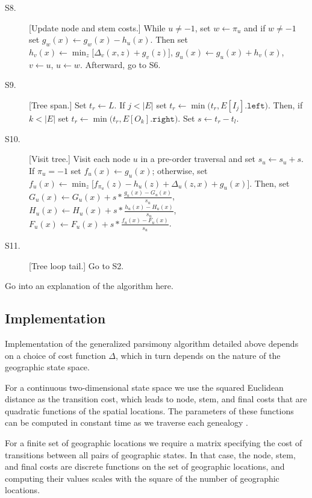 \begin{description}
\item[S8.] [Update node and stem costs.]
    While $u \neq -1$,
        set $w \leftarrow \pi_u$ and
        if $w \neq -1$
            set $g_w(x) \leftarrow g_w(x) - h_u(x)$.
        Then
        set $h_v(x) \leftarrow \min_{z}\bigl[\Delta_v(x,z) + g_v(z)\bigr]$,
        $g_u(x) \leftarrow g_u(x) + h_v(x)$,
        $v \leftarrow u$, $u \leftarrow w$.
    Afterward, go to S6.

\item[S9.] [Tree span.]
    Set $t_r \leftarrow L$.
    If $j < |E|$ set
        $t_r \leftarrow \min\bigl(t_r, E[I_j].\texttt{left}\bigr)$.
    Then,
    if $k < |E|$ set
        $t_r \leftarrow \min\bigl(t_r, E[O_k].\texttt{right}\bigr)$.
    Set $s \leftarrow t_r - t_l$.

\item[S10.] [Visit tree.]
    Visit each node $u$ in a pre-order traversal and set
    $s_u \leftarrow s_u + s$.
    If $\pi_u = -1$ set
        $f_u(x) \leftarrow g_u(x)$;
    otherwise, set 
        $f_u(x) \leftarrow \min_z \bigl[ f_{\pi_u}(z) - h_u(z) + \Delta_u(z,x) + g_u(x) \bigr]$.
    Then, set
        $G_u(x) \leftarrow G_u(x) + s * \frac{g_u(x) - G_u(x)}{s_u}$,
        $H_u(x) \leftarrow H_u(x) + s * \frac{h_u(x) - H_u(x)}{s_u}$,
        $F_u(x) \leftarrow F_u(x) + s * \frac{f_u(x) - F_u(x)}{s_u}$.

\item[S11.] [Tree loop tail.]
    Go to S2.

\end{description}

Go into an explanation of the algorithm here.

\subsection{Implementation}

Implementation of the generalized parsimony algorithm detailed above depends on
a choice of cost function $\Delta$, which in turn depends on the nature of the
geographic state space.

For a continuous two-dimensional state space we use the squared Euclidean
distance as the transition cost, which leads to node, stem, and final
costs that are quadratic functions of the spatial locations. The parameters
of these functions can be computed in constant time as we traverse each
genealogy \cite{Maddison_1991}.

For a finite set of geographic locations we require a matrix specifying the 
cost of transitions between all pairs of geographic states. In that case, the
node, stem, and final costs are discrete functions on the set of geographic
locations, and computing their values scales with the square of the number of
geographic locations. 






